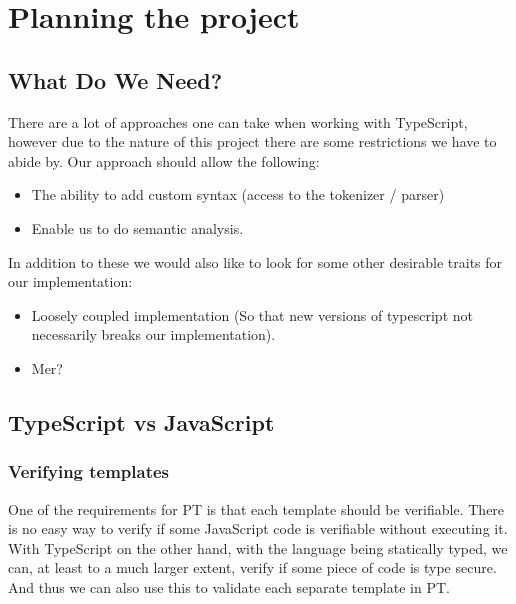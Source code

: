 
\chapter{Planning the project}\label{ch:planning-the-project}

\section{What Do We Need?}\label{sec:what-do-we-need}

There are a lot of approaches one can take when working with TypeScript, however due to the nature of this project there are some restrictions we have to abide by.
Our approach should allow the following:

\begin{itemize}
    \item The ability to add custom syntax (access to the tokenizer / parser)
    \item Enable us to do semantic analysis.
\end{itemize}

In addition to these we would also like to look for some other desirable traits for our implementation:

\begin{itemize}
    \item Loosely coupled implementation (So that new versions of typescript not necessarily breaks our implementation).
    \item Mer?
\end{itemize}


\section{TypeScript vs JavaScript}\label{sec:typescript-vs-javascript}

\subsection{Verifying templates}\label{subsec:why-typescript-verifying-templates}

One of the requirements for PT is that each template should be verifiable.
There is no easy way to verify if some JavaScript code is verifiable without executing it.
With TypeScript on the other hand, with the language being statically typed, we can, at least to a much larger extent, verify if some piece of code is type secure.
And thus we can also use this to validate each separate template in PT.

